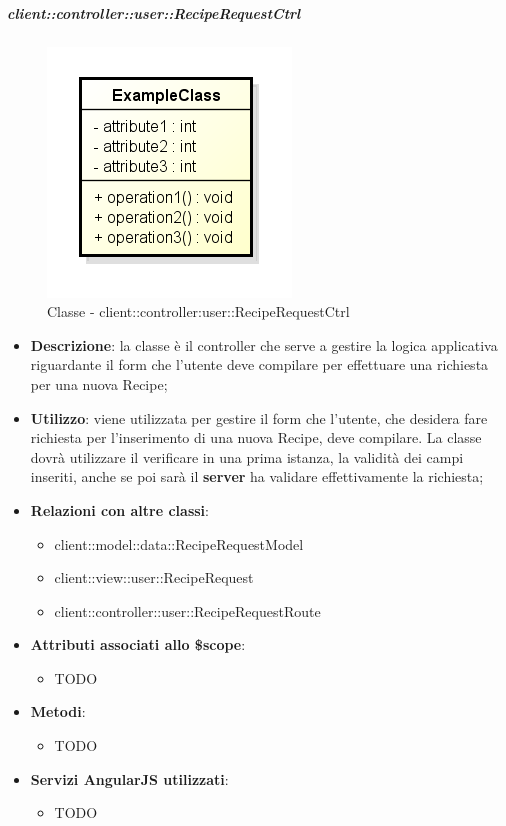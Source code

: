 		\subparagraph{client::controller::user::RecipeRequestCtrl} %
		\label{subp:client_controller_user_reciperequestctrl}
			\begin{figure}[htbp]
				\centering
				\centerline{\includegraphics[scale=0.7]{./images/client/classes/example_class.png}}
				\caption{Classe - client::controller:user::RecipeRequestCtrl}
			\end{figure}
			\begin{itemize}
				\item \textbf{Descrizione}: la classe è il controller che serve a gestire la logica applicativa riguardante il form che l'utente deve compilare per effettuare una richiesta per una nuova Recipe;
				\item \textbf{Utilizzo}: viene utilizzata per gestire il form che l'utente, che desidera fare richiesta per l'inserimento di una nuova Recipe, deve compilare. La classe dovrà utilizzare il verificare in una prima istanza, la validità dei campi inseriti, anche se poi sarà il \textbf{server} ha validare effettivamente la richiesta;
				\item \textbf{Relazioni con altre classi}:
					\begin{itemize}
						\item client::model::data::RecipeRequestModel
						\item client::view::user::RecipeRequest
						\item client::controller::user::RecipeRequestRoute
					\end{itemize}

				\item \textbf{Attributi associati allo \$scope}:
					\begin{itemize}
						\item TODO
					\end{itemize}

				\item \textbf{Metodi}:
					\begin{itemize}
						\item TODO
					\end{itemize}

				\item \textbf{Servizi AngularJS utilizzati}:
					\begin{itemize}
						\item TODO
					\end{itemize}

			\end{itemize}

